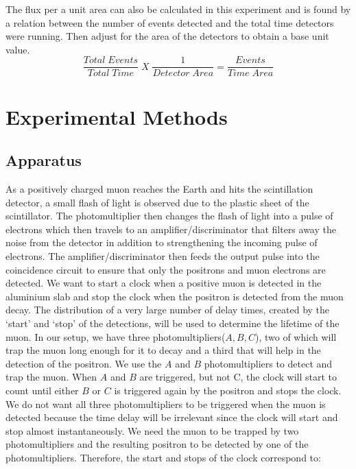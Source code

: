 \indent \indent The flux per a unit area can also be calculated in this experiment and is found by a relation between the number of events detected and the total time detectors were running. Then adjust for the area of the detectors to obtain a base unit value. 
\begin{equation}
\frac{Total\;Events}{Total\;Time}\; X\; \frac{1}{Detector\;Area} = \frac{Events}{Time\;Area}
\end{equation}



\section{Experimental Methods}
\subsection{Apparatus}
\indent  \indent As a positively charged muon reaches the Earth and hits the scintillation detector, a small flash of light is observed due to the plastic sheet of the scintillator. The photomultiplier then changes the flash of light into a pulse of electrons which then travels to an amplifier/discriminator that filters away the noise from the detector in addition to strengthening the incoming pulse of electrons. The amplifier/discriminator then feeds the output pulse into the coincidence circuit to ensure that only the positrons and muon electrons are detected. 
\newline \indent We want to start a clock when a positive muon is detected in the aluminium slab and stop the clock when the positron is detected from the muon decay. The distribution of a very large number of delay times, created by the `start' and `stop' of the detections, will be used to determine the lifetime of the muon. 
\newline \indent In our setup, we have three photomultipliers($A, B, C$), two of which will trap the muon long enough for it to decay and a third that will help in the detection of the positron. We use the $A$ and $B$ photomultipliers to detect and trap the muon. When $A$ and $B$ are triggered, but not C, the clock will start to count until either $B$ or $C$ is triggered again by the positron and stops the clock. We do not want all three photomultipliers to be triggered when the muon is detected because the time delay will be irrelevant since the clock will start and stop almost instantaneously. We need the muon to be trapped by two photomultipliers and the resulting positron to be detected by one of the photomultipliers. Therefore, the start and stops of the clock correspond to:
